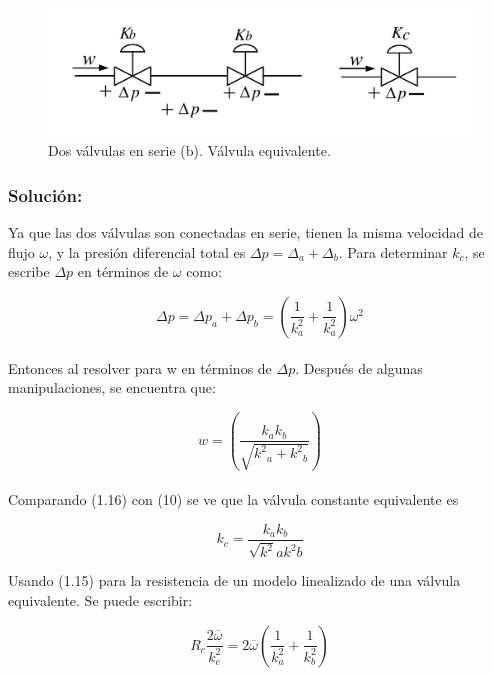 \documentclass[a4paper,12pt,twoside]{proyectotanquesecci}
\begin{document}
\begin{figure}[h]
\centering
\includegraphics[scale=0.5]{Figura6}
\renewcommand{\figurename}{Fig.}
\caption{Dos válvulas en serie (b). Válvula equivalente.}
\label{Dos válvulas en serie (b). Válvula equivalente.}
\end{figure}

\subsubsection{Solución:}

Ya que las dos válvulas son conectadas en serie, tienen la misma velocidad de flujo $\omega$, y la presión diferencial total es $\Delta p = \Delta_{a}+\Delta_{b}$. Para determinar $k_{c}$, se escribe $\Delta p$ en términos de $\omega$ como:

\begin{equation}
\Delta p= \Delta p_{a}+\Delta p_{b} = \left(\frac{1}{k^{2}_{a}}+\frac{1}{k^{2}_{a}}\right)\omega^{2}
\end{equation} \\

Entonces al resolver para w en términos de $\Delta p$. Después de algunas manipulaciones, se encuentra que:

\begin{equation}
w=\left(\frac{{k_{a}k_{b}}}{\sqrt{{k^{2}}_{a}+{k^{2}}_{b}}} \right)
\end{equation} \\

Comparando (1.16) con (10) se ve que la válvula constante equivalente es

\begin{equation}
k_{c}=\frac{k_{a} k_{b}}{\sqrt{k^{2}}a{k^{2}}b}
\end{equation}

Usando (1.15) para la resistencia  de un modelo linealizado de una válvula equivalente. Se puede escribir:

\begin{equation}
R_{c}\frac{2\overline{\omega}}{k^{2}_{c}}=
2\overline{\omega}(\frac{1}{k^{2}_{a}}+\frac{1}{k^{2}_{b}})
\end{equation} \\
\end{document}
